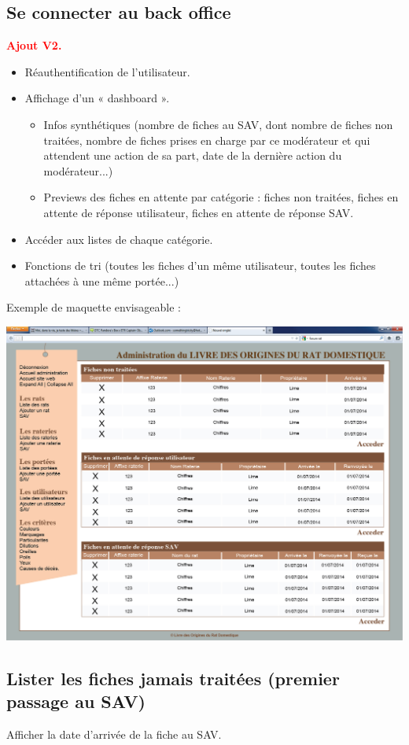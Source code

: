 \documentclass[a4paper,10pt]{article}
\newcommand\desire[1]{\noindent\textbf{\textcolor{red}{#1}}}
\begin{document}
\subsection{Se connecter au back office}
\desire{Ajout V2.} 
\begin{itemize}
\item Réauthentification de l'utilisateur. 
\item Affichage d'un « dashboard ».
\begin{itemize}
\item Infos synthétiques (nombre de fiches au SAV, dont nombre de fiches non traitées, nombre de fiches prises en charge par ce modérateur et qui attendent une action de sa part, date de la dernière action du modérateur...)
\item Previews des fiches en attente par catégorie : fiches non traitées, fiches en attente de réponse utilisateur, fiches en attente de réponse SAV.
\end{itemize}
\item Accéder aux listes de chaque catégorie.
\item Fonctions de tri (toutes les fiches d'un même utilisateur, toutes les fiches attachées à une même portée...)
\end{itemize}

Exemple de maquette envisageable :

\begin{center}\includegraphics[width=0.8\linewidth]{MaquetteSAV.jpg}\end{center}

\subsection{Lister les fiches jamais traitées (premier passage au SAV)}
Afficher la date d'arrivée de la fiche au SAV.
\end{document}

